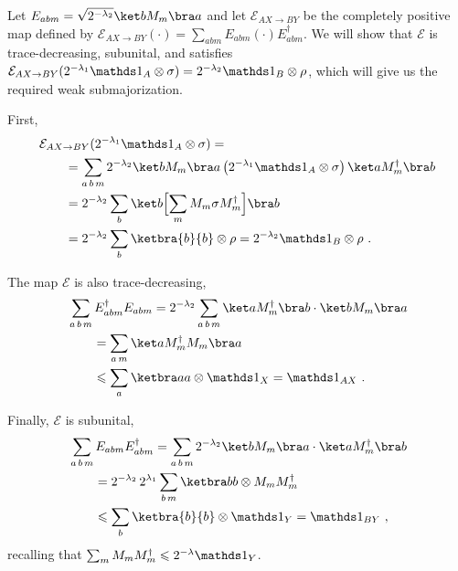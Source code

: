 \documentclass[11pt,a4paper]{article}
\newenvironment{myproof}[1][\proofname]{%
  \color{prooftextcolor} \footnotesize \proof[\itshape #1]\hspace*{1.2mm}%
}{\endproof}
\begin{document}
\begin{myproof}[Proof of Prop.~\ref{prop:LambdaMajorizationTMap}]
  Let $E_{abm} = \sqrt{2^{-\lambda_2}} \ket b M_m \bra a$ and let $\mathcal{E}_{AX\rightarrow BY}$ be the
  completely positive map defined by $\mathcal{E}_{AX\rightarrow BY}(\cdot) =
  \sum_{abm} E_{abm}\left(\cdot\right)E_{abm}^\dagger$. We will show that $\mathcal{E}$ is trace-decreasing,
  subunital, and satisfies $\mathcal{E}_{AX\rightarrow BY}(2^{-\lambda_1}\Ident_A\otimes\sigma) =
  2^{-\lambda_2}\Ident_B\otimes\rho$,
  which will give us the required weak submajorization.
  
  First,
  \begin{align*}
    &\mathcal{E}_{AX\rightarrow BY}(2^{-\lambda_1}\Ident_A\otimes\sigma) = \\
    &\qquad = \sum_{a\,b\,m} 2^{-\lambda_2} \ket b M_m \bra a \left(2^{-\lambda_1}\Ident_A\otimes\sigma\right)
    \ket a M_m^\dagger \bra b \\
    &\qquad = 2^{-\lambda_2} \sum_{b} \ket b \Bigl[\sum_m M_m \sigma M_m^\dagger \Bigr] \bra b \\
    &\qquad = 2^{-\lambda_2} \sum_b \ketbra{b}{b}\otimes \rho  = 2^{-\lambda_2}\Ident_B\otimes\rho\ .
  \end{align*}

  The map $\mathcal{E}$ is also trace-decreasing,
  \begin{align*}
    &\sum_{a\,b\,m} E_{abm}^\dagger E_{abm} = 2^{-\lambda_2} \sum_{a\,b\,m} \ket a M_m^\dagger \bra b\cdot
    \ket b M_m \bra a \\
    &\qquad = \sum_{a\,m} \ket a M_m^\dagger M_m \bra a \\
    &\qquad \leqslant \sum_a \ketbra aa \otimes \Ident_X
    = \Ident_{AX}\ .
  \end{align*}

  Finally, $\mathcal{E}$ is subunital,
  \begin{align*}
    &\sum_{a\,b\,m} E_{abm} E_{abm}^\dagger
    = \sum_{a\,b\,m} 2^{-\lambda_2} \ket b M_m \bra a \cdot \ket a M_m^\dagger \bra b \\
    &\qquad = 2^{-\lambda_2}\,2^{\lambda_1} \sum_{b\,m} \ketbra bb \otimes M_m M_m^\dagger \\
    &\qquad \leqslant \sum_b \ketbra{b}{b}\otimes \Ident_Y = \Ident_{BY}\ ,
  \end{align*}
  recalling that $\sum_m M_m M_m^\dagger \leqslant 2^{-\lambda}\Ident_Y$.
\end{myproof}


%
%


\end{document}
